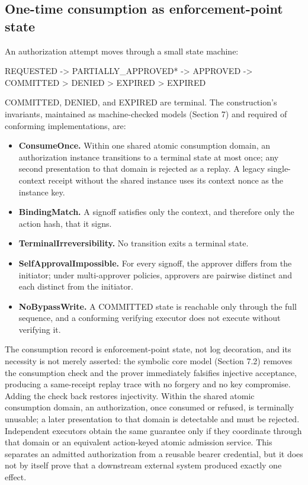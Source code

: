 \documentclass[11pt]{article}
\begin{document}
\subsection{One-time consumption as enforcement-point state}

An authorization attempt moves through a small state machine:

\begin{tool}
REQUESTED -> {PARTIALLY_APPROVED}* -> APPROVED -> COMMITTED
          \-> DENIED                          \-> EXPIRED
          \-> EXPIRED
\end{tool}

COMMITTED, DENIED, and EXPIRED are terminal. The construction's invariants,
maintained as machine-checked models (Section 7) and required of conforming
implementations, are:

\begin{itemize}[leftmargin=*]
\item \textbf{ConsumeOnce.} Within one shared atomic consumption domain, an
authorization instance transitions to a terminal state at most once; any second
presentation to that domain is rejected as a replay. A legacy single-context
receipt without the shared instance uses its context nonce as the instance key.
\item \textbf{BindingMatch.} A signoff satisfies only the context, and therefore
only the action hash, that it signs.
\item \textbf{TerminalIrreversibility.} No transition exits a terminal state.
\item \textbf{SelfApprovalImpossible.} For every signoff, the approver differs
from the initiator; under multi-approver policies, approvers are pairwise distinct
and each distinct from the initiator.
\item \textbf{NoBypassWrite.} A COMMITTED state is reachable only through the full
sequence, and a conforming verifying executor does not execute without verifying
it.
\end{itemize}

The consumption record is enforcement-point state, not log decoration, and its
necessity is not merely asserted: the symbolic core model (Section 7.2) removes the
consumption check and the prover immediately falsifies injective acceptance,
producing a same-receipt replay trace with no forgery and no key compromise.
Adding the check back restores injectivity. Within the shared atomic consumption
domain, an authorization, once consumed or refused, is terminally unusable; a
later presentation to that domain is detectable and must be rejected. Independent
executors obtain the same guarantee only if they coordinate through that domain or
an equivalent action-keyed atomic admission service. This separates an admitted
authorization from a reusable bearer credential, but it does not by itself prove
that a downstream external system produced exactly one effect.
\end{document}
